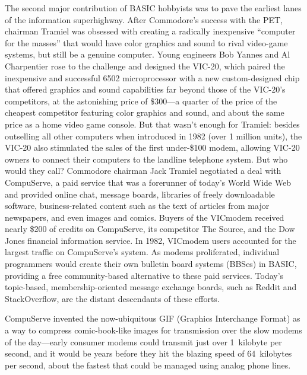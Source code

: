The second major contribution of BASIC hobbyists was to pave the
earliest lanes of the information superhighway.
After Commodore's success with the PET, chairman Tramiel was obsessed
with creating a radically inexpensive ``computer for the masses'' that
would have color graphics and sound to rival video-game systems, but
still be a genuine computer.
Young engineers Bob Yannes and Al Charpentier rose to the challenge
and designed the VIC-20, which paired the inexpensive and successful 6502
microprocessor with a new custom-designed chip that offered graphics and sound
capabilities far beyond those of the VIC-20's competitors, at the astonishing
price of \$300---a quarter of the price of the cheapest
competitor featuring color graphics and sound, and about the same price
as a home video game console.
But that wasn't enough for Tramiel: besides outselling all other computers when introduced in
1982 (over 1 million units), the VIC-20 also stimulated the sales of the first
under-\$100 modem, allowing VIC-20 owners to connect their computers
to the landline telephone system.  But who would they call?
Commodore chairman Jack Tramiel negotiated a deal with 
CompuServe, a paid service that was a forerunner of
today's World Wide Web and provided online chat, message boards,
libraries of freely downloadable software, business-related
content such as the text of articles from major newspapers, and even
images and comics.  Buyers of the VICmodem received nearly \$200 of credits
on CompuServe, its competitor The Source, and the Dow Jones financial
information service.  In 1982, VICmodem users accounted for the largest
traffic on CompuServe's system.
As modems proliferated, individual programmers would create their own
bulletin board systems (BBSes)  in BASIC, providing a free
community-based alternative to these paid services.
Today's topic-based, membership-oriented message exchange boards, such
as Reddit and StackOverflow, are the distant descendants of these
efforts.

\begin{tangent}
  CompuServe invented the now-ubiquitous GIF (Graphics Interchange Format) as a way to
  compress comic-book-like images for transmission over the slow
  modems of the day---early consumer modems could transmit just over
  1~kilobyte per second, and it would be years before they hit the
  blazing speed of 64~kilobytes per second, about the fastest that
  could be managed using analog phone lines.
\end{tangent}

